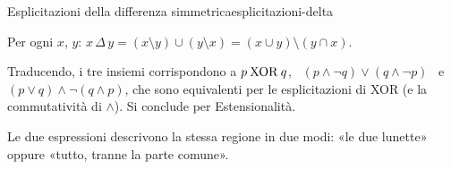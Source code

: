 \begin{concetto}
\begin{Proposizione}{Esplicitazioni della differenza simmetrica}{esplicitazioni-delta}
    \begin{prerequisiti}
    \end{prerequisiti}
    Per ogni $x$, $y$: \quad $x \,\Delta\, y = (x \setminus y) \cup (y \setminus x) = (x \cup y) \setminus (y \cap x)$.
\end{Proposizione}
\begin{dimostrazione}
    Traducendo, i tre insiemi corrispondono a $p \mathbin{\mathrm{XOR}} q$, \ $(p \wedge \neg q) \vee (q \wedge \neg p)$ \ e
    $(p \vee q) \wedge \neg(q \wedge p)$, che sono equivalenti per le esplicitazioni di XOR
    (e la commutatività di $\wedge$). Si conclude per Estensionalità.
\end{dimostrazione}
\end{concetto}

\begin{spiegazione}
    Le due espressioni descrivono la stessa regione in due modi: «le due lunette» oppure «tutto, tranne la parte comune».
    \begin{center}
    \end{center}
\end{spiegazione}


